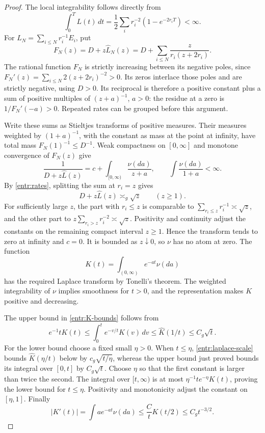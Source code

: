 \begin{proof}
The local integrability follows directly from
\[
 \int_0^T L(t)\,dt
 =\frac12\sum_i r_i^{-2}(1-e^{-2r_iT})<\infty.
\]
For \(L_N=\sum_{i\le N}r_i^{-1}E_i\), put
\[
 F_N(z)=D+z\widehat L_N(z)
       =D+\sum_{i\le N}\frac{z}{r_i(z+2r_i)}.
\]
The rational function \(F_N\) is strictly increasing between its
negative poles, since
\(F_N'(z)=\sum_{i\le N}2(z+2r_i)^{-2}>0\).
Its zeros interlace those poles and are strictly negative, using \(D>0\).
Its reciprocal is therefore a positive constant plus a sum of positive
multiples of \((z+a)^{-1}\), \(a>0\): the residue at a zero is
\(1/F_N'(-a)>0\).  Repeated rates can be grouped before this argument.

Write these sums as Stieltjes transforms of positive measures.  Their
measures weighted by \((1+a)^{-1}\), with the constant as mass at the
point at infinity, have total mass \(F_N(1)^{-1}\le D^{-1}\).
Weak compactness on \([0,\infty]\) and monotone convergence of
\(F_N(z)\) give
\[
 \frac1{D+z\widehat L(z)}
   =c+\int_{[0,\infty)}\frac{\nu(da)}{z+a},
 \qquad \int\frac{\nu(da)}{1+a}<\infty.
\]
By \eqref{entr:rates}, splitting the sum at \(r_i=z\) gives
\begin{equation}\label{entr:laplace-scale}
 D+z\widehat L(z)\asymp_g \sqrt z\qquad(z\ge1).
\end{equation}
For sufficiently large \(z\), the part with \(r_i\le z\) is
comparable to \(\sum_{r_i\le z}r_i^{-1}\asymp\sqrt z\), and the
other part to \(z\sum_{r_i>z}r_i^{-2}\asymp\sqrt z\).
Positivity and continuity adjust the constants on the remaining
compact interval \(z\ge1\).
Hence the transform tends to zero at infinity and \(c=0\).
It is bounded as \(z\downarrow0\), so \(\nu\) has no atom at zero.
The function
\[
 K(t)=\int_{(0,\infty)}e^{-at}\nu(da)
\]
has the required Laplace transform by Tonelli's theorem.  The weighted
integrability of \(\nu\) implies smoothness for \(t>0\), and the
representation makes \(K\) positive and decreasing.

The upper bound in \eqref{entr:K-bounds} follows from
\[
 e^{-1}tK(t)\le\int_0^t e^{-v/t}K(v)\,dv
 \le\widehat K(1/t)\le C_g\sqrt t.
\]
For the lower bound choose a fixed small \(\eta>0\).  When \(t\le\eta\),
\eqref{entr:laplace-scale} bounds
\(\widehat K(\eta/t)\) below by \(c_g\sqrt{t/\eta}\), whereas the
upper bound just proved bounds its integral over \([0,t]\) by
\(C_g\sqrt t\).  Choose \(\eta\) so that the first constant is larger
than twice the second.  The integral over \([t,\infty)\) is at most
\(\eta^{-1}t e^{-\eta}K(t)\), proving the lower bound for \(t\le\eta\).
Positivity and monotonicity adjust the constant on \([\eta,1]\).
Finally
\[
 |K'(t)|=\int a e^{-at}\nu(da)
 \le \frac{C}{t}K(t/2)\le C_g t^{-3/2}.
\]


\end{proof}
